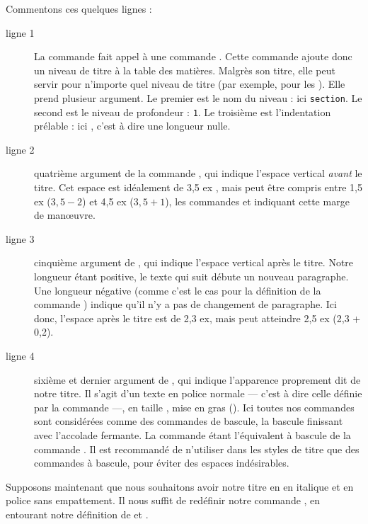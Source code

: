 Commentons ces quelques lignes :

\begin{description}
\item[ligne 1]La commande  fait appel à une commande . Cette commande ajoute donc un niveau de titre à la table des matières. Malgrès son titre, elle peut servir pour n'importe quel niveau de titre (par exemple, pour les ). Elle prend plusieur argument. Le premier est le nom du niveau : ici \verb|section|. Le second est le niveau de profondeur : \verb|1|. Le troisième est l'indentation prélable : ici , c'est à dire une longueur nulle.

\item[ligne 2] quatrième argument de la commande , qui indique l'espace vertical \emph{avant} le titre. Cet espace est idéalement de 3,5 ex , mais peut être compris entre 1,5 ex ($3,5 - 2$) et 4,5 ex ($3,5 + 1$), les commandes  et  indiquant cette marge de manœuvre.
\item[ligne 3] cinquième argument de , qui indique l'espace vertical après le titre. Notre longueur étant positive, le texte qui suit débute un nouveau paragraphe. Une longueur négative (comme c'est le cas pour la définition de la commande ) indique qu'il n'y a pas de changement de paragraphe. Ici donc, l'espace après le titre est de 2,3 ex, mais peut atteindre 2,5 ex (2,3 + 0,2).
\item[ligne 4] sixième et dernier argument de , qui indique l'apparence proprement dit de notre titre. Il s'agit d'un texte en police normale --- c'est à dire celle définie par la commande  ---, en taille , mise en gras (). Ici toutes nos commandes sont considérées comme des commandes de bascule, la bascule finissant avec l'accolade fermante. La commande  étant l'équivalent à bascule de la commande . Il est recommandé de n'utiliser dans les styles de titre que des commandes à bascule, pour éviter des espaces indésirables.\label{bfseries}
\end{description}

Supposons maintenant que nous souhaitons avoir notre titre en en italique et en police sans empattement. Il nous suffit de redéfinir notre commande , en entourant notre définition de  et .

